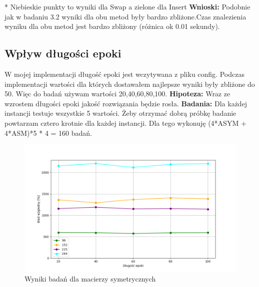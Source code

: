 \documentclass{article}
\begin{document}
        \FloatBarrier
        * Niebieskie punkty to wyniki dla Swap a zielone dla Insert\linebreak
        \textbf{Wnioski: } Podobnie jak w badaniu 3.2 wyniki dla obu metod były bardzo
        zbliżone.Czas znalezienia wyniku dla obu metod jest bardzo zbliżony (różnica ok 0.01 sekundy).
      \subsection{Wpływ długości epoki}
        W mojej implementacji długość epoki jest wczytywana z pliku config. 
        Podczas implementacji wartości dla których dostawałem najlepsze
        wyniki były zbliżone do 50. Więc do badań używam wartości 
        20,40,60,80,100.\linebreak
        \textbf{Hipoteza: } Wraz ze wzrostem długości epoki jakość rozwiązania będzie 
        rosła.\linebreak 
        \textbf{Badania: } Dla każdej instancji testuje wszystkie 5 wartości. 
        Żeby otrzymać dobrą próbkę badanie powtarzam cztero krotnie dla każdej 
        instancji. Dla tego wykonuję (4*ASYM + 4*ASM)*5 * 4 = 160 badań.\linebreak 
        \FloatBarrier
        
        \FloatBarrier
        \begin{figure}[ht]
          \centering
          \includegraphics[width=\textwidth]{src/plots/symAnEpoch.png}
          \caption{Wyniki badań dla macierzy symetrycznych}
          \label{fig:symEpoch}
        \end{figure}
\end{document}
